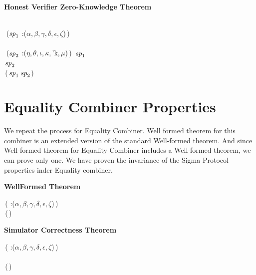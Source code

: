 \textbf{Honest Verifier Zero-Knowledge Theorem}
\begin{holmath}
    \\
\,\,(\ensuremath{\HOLFreeVar{sp}\sb{\mathrm{1}}} :(\ensuremath{\alpha},\,\ensuremath{\beta},\,\ensuremath{\gamma},\,\ensuremath{\delta},\,\ensuremath{\epsilon},\,\ensuremath{\zeta})\,)\,\HOLSymConst{\HOLTokenConj{}}\\
\\
\,\,(\ensuremath{\HOLFreeVar{sp}\sb{\mathrm{2}}} :(\ensuremath{\eta},\,\ensuremath{\theta},\,\ensuremath{\iota},\,\ensuremath{\kappa},\,'k,\,\ensuremath{\mu})\,)\,\HOLSymConst{\HOLTokenConj{}}\,\,\ensuremath{\HOLFreeVar{sp}\sb{\mathrm{1}}}\,\HOLSymConst{\HOLTokenConj{}}\\
\,\ensuremath{\HOLFreeVar{sp}\sb{\mathrm{2}}}\,\HOLSymConst{\HOLTokenImp{}}\\
\,(\,\ensuremath{\HOLFreeVar{sp}\sb{\mathrm{1}}}\,\ensuremath{\HOLFreeVar{sp}\sb{\mathrm{2}}})
\end{holmath}  

\newpage
\section{Equality Combiner Properties}
We repeat the process for Equality Combiner. Well formed theorem for this combiner is an extended version of the standard Well-formed theorem. And since Well-formed theorem for Equality Combiner includes a Well-formed theorem, we can prove only one. We have proven the invariance of the Sigma Protocol properties inder Equality combiner.


\textbf{WellFormed Theorem}
\begin{holmath}
    \,( :(\ensuremath{\alpha},\,\ensuremath{\beta},\,\ensuremath{\gamma},\,\ensuremath{\delta},\,\ensuremath{\epsilon},\,\ensuremath{\zeta})\,)\,\HOLSymConst{\HOLTokenImp{}}\\
\,(\,)
\end{holmath}  

\textbf{Simulator Correctness Theorem}
\begin{holmath}
    \,( :(\ensuremath{\alpha},\,\ensuremath{\beta},\,\ensuremath{\gamma},\,\ensuremath{\delta},\,\ensuremath{\epsilon},\,\ensuremath{\zeta})\,)\,\HOLSymConst{\HOLTokenConj{}}\\
\,\,\HOLSymConst{\HOLTokenImp{}}\\
\,(\,)
\end{holmath}  

